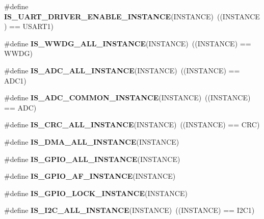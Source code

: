 \begin{DoxyCompactItemize}
\mbox{\label{group___exported__macro_ga98f122ffe4d77f03a13f682301e2d596}} 
\#define {\bfseries I\+S\+\_\+\+U\+A\+R\+T\+\_\+\+D\+R\+I\+V\+E\+R\+\_\+\+E\+N\+A\+B\+L\+E\+\_\+\+I\+N\+S\+T\+A\+N\+CE}(I\+N\+S\+T\+A\+N\+CE)~((I\+N\+S\+T\+A\+N\+CE) == U\+S\+A\+R\+T1)
\item 
\mbox{\label{group___exported__macro_gac2a8aaec233e19987232455643a04d6f}} 
\#define {\bfseries I\+S\+\_\+\+W\+W\+D\+G\+\_\+\+A\+L\+L\+\_\+\+I\+N\+S\+T\+A\+N\+CE}(I\+N\+S\+T\+A\+N\+CE)~((I\+N\+S\+T\+A\+N\+CE) == W\+W\+DG)
\item 
\mbox{\label{group___exported__macro_ga2204b62b378bcf08b3b9006c184c7c23}} 
\#define {\bfseries I\+S\+\_\+\+A\+D\+C\+\_\+\+A\+L\+L\+\_\+\+I\+N\+S\+T\+A\+N\+CE}(I\+N\+S\+T\+A\+N\+CE)~((I\+N\+S\+T\+A\+N\+CE) == A\+D\+C1)
\item 
\mbox{\label{group___exported__macro_gad8a5831c786b6b265531b890a194cbe2}} 
\#define {\bfseries I\+S\+\_\+\+A\+D\+C\+\_\+\+C\+O\+M\+M\+O\+N\+\_\+\+I\+N\+S\+T\+A\+N\+CE}(I\+N\+S\+T\+A\+N\+CE)~((I\+N\+S\+T\+A\+N\+CE) == A\+DC)
\item 
\mbox{\label{group___exported__macro_gaa514941a7f02f65eb27450c05e4e8dd1}} 
\#define {\bfseries I\+S\+\_\+\+C\+R\+C\+\_\+\+A\+L\+L\+\_\+\+I\+N\+S\+T\+A\+N\+CE}(I\+N\+S\+T\+A\+N\+CE)~((I\+N\+S\+T\+A\+N\+CE) == C\+RC)
\item 
\#define {\bfseries I\+S\+\_\+\+D\+M\+A\+\_\+\+A\+L\+L\+\_\+\+I\+N\+S\+T\+A\+N\+CE}(I\+N\+S\+T\+A\+N\+CE)
\item 
\#define {\bfseries I\+S\+\_\+\+G\+P\+I\+O\+\_\+\+A\+L\+L\+\_\+\+I\+N\+S\+T\+A\+N\+CE}(I\+N\+S\+T\+A\+N\+CE)
\item 
\#define {\bfseries I\+S\+\_\+\+G\+P\+I\+O\+\_\+\+A\+F\+\_\+\+I\+N\+S\+T\+A\+N\+CE}(I\+N\+S\+T\+A\+N\+CE)
\item 
\#define {\bfseries I\+S\+\_\+\+G\+P\+I\+O\+\_\+\+L\+O\+C\+K\+\_\+\+I\+N\+S\+T\+A\+N\+CE}(I\+N\+S\+T\+A\+N\+CE)
\item 
\mbox{\label{group___exported__macro_gacdf0149a4e8c41a6814c13613c38a6b2}} 
\#define {\bfseries I\+S\+\_\+\+I2\+C\+\_\+\+A\+L\+L\+\_\+\+I\+N\+S\+T\+A\+N\+CE}(I\+N\+S\+T\+A\+N\+CE)~((I\+N\+S\+T\+A\+N\+CE) == I2\+C1)

\end{DoxyCompactItemize}
